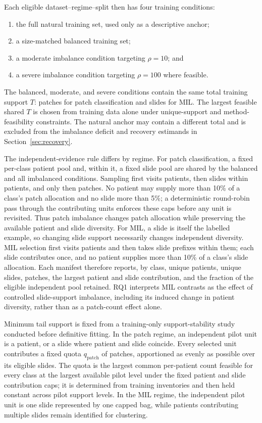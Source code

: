 \documentclass[11pt]{article}
\begin{document}
Each eligible dataset--regime--split then has four training conditions:
\begin{enumerate}
  \item the full natural training set, used only as a descriptive anchor;
  \item a size-matched balanced training set;
  \item a moderate imbalance condition targeting $\rho=10$; and
  \item a severe imbalance condition targeting $\rho=100$ where feasible.
\end{enumerate}
The balanced, moderate, and severe conditions contain the same total training support $T$: patches for patch classification and slides for MIL. The largest feasible shared $T$ is chosen from training data alone under unique-support and method-feasibility constraints. The natural anchor may contain a different total and is excluded from the imbalance deficit and recovery estimands in Section~\ref{sec:recovery}.

The independent-evidence rule differs by regime. For patch classification, a fixed per-class patient pool and, within it, a fixed slide pool are shared by the balanced and all imbalanced conditions. Sampling first visits patients, then slides within patients, and only then patches. No patient may supply more than 10\% of a class's patch allocation and no slide more than 5\%; a deterministic round-robin pass through the contributing units enforces these caps before any unit is revisited. Thus patch imbalance changes patch allocation while preserving the available patient and slide diversity. For MIL, a slide is itself the labelled example, so changing slide support necessarily changes independent diversity. MIL selection first visits patients and then takes slide prefixes within them; each slide contributes once, and no patient supplies more than 10\% of a class's slide allocation. Each manifest therefore reports, by class, unique patients, unique slides, patches, the largest patient and slide contribution, and the fraction of the eligible independent pool retained. RQ1 interprets MIL contrasts as the effect of controlled slide-support imbalance, including its induced change in patient diversity, rather than as a patch-count effect alone.

Minimum tail support is fixed from a training-only support-stability study conducted before definitive fitting. In the patch regime, an independent pilot unit is a patient, or a slide where patient and slide coincide. Every selected unit contributes a fixed quota $q_{\mathrm{patch}}$ of patches, apportioned as evenly as possible over its eligible slides. The quota is the largest common per-patient count feasible for every class at the largest available pilot level under the fixed patient and slide contribution caps; it is determined from training inventories and then held constant across pilot support levels. In the MIL regime, the independent pilot unit is one slide represented by one capped bag, while patients contributing multiple slides remain identified for clustering.
\end{document}
